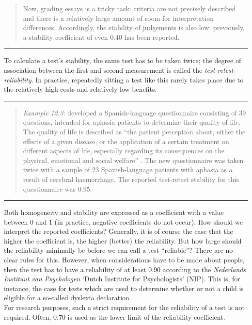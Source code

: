 \documentclass[
]{book}
\begin{document}
\begin{quote}
Now, grading essays is a tricky task: criteria are not precisely described
and there is a relatively large amount of room for
interpretation differences. Accordingly, the stability of judgements is also
low; previously, a stability coefficient of even \(0.40\) has
been reported.
\end{quote}

\begin{center}\rule{0.5\linewidth}{0.5pt}\end{center}

To calculate a test's stability, the same test has to be
taken twice; the degree of association between the first and
second measurement is called the \emph{test-retest-reliability}.
In practice, repeatedly sitting a test like this rarely takes place due to
the relatively high costs and relatively low benefits.

\begin{center}\rule{0.5\linewidth}{0.5pt}\end{center}

\begin{quote}
\emph{Example 12.3:}
\citet{Lata09} developed
a Spanish-language questionnaire consisting of 39 questions, intended
for aphasia patients to determine their quality of life. The quality of life
is described as ``the patient perception about, either the
effects of a given disease, or the application of a certain treatment on
different aspects of life, especially regarding its consequences on the
physical, emotional and social welfare'' \citep[p.379]{Lata09}. The new questionnaire
was taken twice with a sample of 23
Spanish-language patients with aphasia as a result of cerebral haemorrhage.
The reported test-retest stability for this questionnaire was
\(0.95\).
\end{quote}

\begin{center}\rule{0.5\linewidth}{0.5pt}\end{center}

Both homogeneity and stability are expressed as a
coefficient with a value between \(0\) and \(1\) (in practice, negative coefficients
do not occur). How should we interpret the reported
coefficients? Generally, it is of course the case that the higher the coefficient is,
the higher (better) the reliability. But how large should the reliability minimally be
before we can call a test ``reliable''? There are no clear rules for this.
However, when considerations have to be made about people, then the test has to
have a reliability of at least \(0.90\) according to the \emph{Nederlands
Instituut van Psychologen} `Dutch Institute for Psychologists' (NIP).
This is, for instance, the case for tests which are used to determine whether or not a child is eligible for a so-called dyslexia declaration.\\
For research purposes, such a strict requirement for the reliability of a
test is not required. Often, \(0.70\) is used as the lower limit of the
reliability coefficient.
\end{document}
